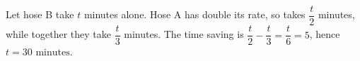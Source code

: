 Let hose B take $t$ minutes alone. Hose A has double its rate, so takes $\dfrac{t}{2}$ minutes, while together they take $\dfrac{t}{3}$ minutes. The time saving is $\dfrac{t}{2}-\dfrac{t}{3}=\dfrac{t}{6}=5$, hence $\boxed{t=30\text{ minutes}}$.
